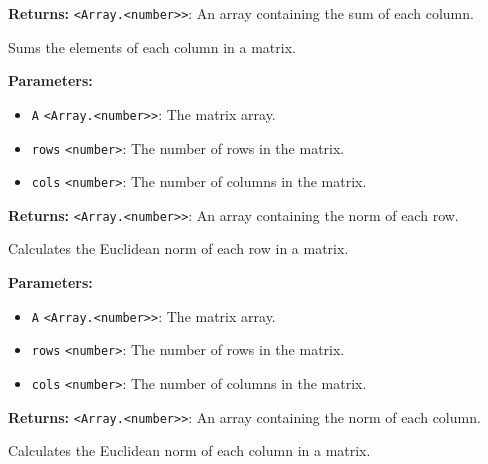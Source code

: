 \documentclass[12pt,a4paper]{article}
\begin{document}
\noindent \textbf{Returns:} \texttt{<Array.<number>>}: An array containing the sum of each column.

\noindent Sums the elements of each column in a matrix.

\vspace{5mm}
\noindent {}


\noindent \textbf{Parameters:}
\begin{itemize}
  \item \texttt{A} \texttt{<Array.<number>>}: The matrix array.
  \item \texttt{rows} \texttt{<number>}: The number of rows in the matrix.
  \item \texttt{cols} \texttt{<number>}: The number of columns in the matrix.
\end{itemize}

\noindent \textbf{Returns:} \texttt{<Array.<number>>}: An array containing the norm of each row.

\noindent Calculates the Euclidean norm of each row in a matrix.

\vspace{5mm}
\noindent {}


\noindent \textbf{Parameters:}
\begin{itemize}
  \item \texttt{A} \texttt{<Array.<number>>}: The matrix array.
  \item \texttt{rows} \texttt{<number>}: The number of rows in the matrix.
  \item \texttt{cols} \texttt{<number>}: The number of columns in the matrix.
\end{itemize}

\noindent \textbf{Returns:} \texttt{<Array.<number>>}: An array containing the norm of each column.

\noindent Calculates the Euclidean norm of each column in a matrix.

\vspace{5mm}
\noindent {}
\end{document}
